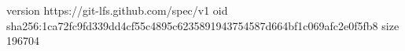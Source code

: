 version https://git-lfs.github.com/spec/v1
oid sha256:1ca72fc9fd339dd4cf55c4895c6235891943754587d664bf1c069afc2e0f5fb8
size 196704
